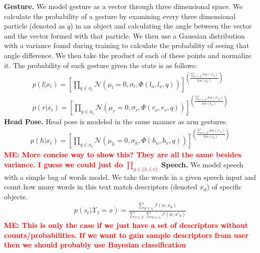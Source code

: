 \documentclass[letterpaper, 10 pt, conference]{ieeeconf}
\newcommand{\menote}[1]{\textcolor{Red}{\textbf{ME: #1}}}
\begin{document}
{\bf Gesture.}  We model gesture as a vector through three dimensional space. We calculate the probability of a gesture by examining every three dimensional particle (denoted as $q$) in an object and calculating the angle between the vector and the vector formed with that particle. We then use a Gaussian distribution with a  variance found during training to calculate the probability of seeing that angle difference. We then take the product of each of these points and normalize it. The probability of each gesture given the state is as follows:
\begin{align}
p(l|x_t) = [\displaystyle \prod_{q \in x_t} \mathcal{N}(\mu_l=0, \sigma_l, \Phi(l_o,l_v, q))]^{(\frac{\sum_{x'\in\mathcal{X}} len(x'_p)}{len(x_p)})}\\
p(r|x_t) = [\displaystyle \prod_{q \in x_t} \mathcal{N}(\mu_r=0, \sigma_r, \Phi(r_o,r_v, q))]^{(\frac{\sum_{x'\in\mathcal{X}} len(x'_p)}{len(x_p)})}
\end{align}
{\bf Head Pose.}
Head pose is modeled in the same manner as arm gestures.
\begin{align}
p(h|x_t) = [\displaystyle \prod_{q \in x_t} \mathcal{N}(\mu_h=0, \sigma_h, \Phi(h_o,h_v, q))]^{(\frac{\sum_{x'\in\mathcal{X}} len(x'_p)}{len(x_p)})}
\end{align}
\menote{More concise way to show this? They are all the same besides variance. I guess we could just do $\prod_{g\in\{h,l,r\}}$}
{\bf Speech.}
We model speech with a simple bag of words model. We take the words in a given speech input and count how many words in this text match descriptors (denoted  $x_d$) of specific objects.
\begin{align}
p(s_t |\mathcal{X}_t=x) = \frac{\displaystyle\sum_{w\in s_{t}} \mathcal{I}(w, x_d)}{\displaystyle\sum_{x \in \mathcal{X}}\sum_{w\in s_{t}} \mathcal{I}(w, x'_d)}
\end{align}
\menote{This is only the case if we just have a set of descriptors without counts/probabilities. If we want to gain sample descriptors from user then we should probably use Bayesian classification}
\end{document}
